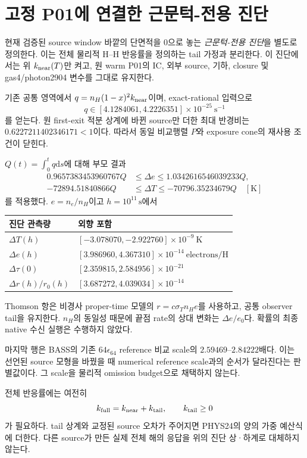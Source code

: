 \documentclass[11pt,a4paper]{article}
\newcommand{\dd}{\mathrm d}\newcommand{\kb}{k_{\rm B}}\newcommand{\ev}{\epsilon_{\rm eV}}\newcommand{\eV}{\mathrm{eV}}\newcommand{\cm}{\mathrm{CM}}\newcommand{\lab}{\mathrm{lab}}
\numberwithin{equation}{section}
\begin{document}
\newpage
\section{고정 P01에 연결한 근문턱-전용 진단}
현재 검증된 source window 바깥의 단면적을 0으로 놓는 \emph{근문턱-전용 진단}을 별도로 정의한다. 이는 전체 물리적 H--H 반응률을 정의하는 tail 가정과 분리한다. 이 진단에서는 위 $k_{\rm near}(T)$만 켜고, 원 warm P01의 IC, 외부 source, 기하, closure 및 gas4/photon2904 변수를 그대로 유지한다.

기존 공통 영역에서 $q=n_H(1-x)^2k_{\rm near}$이며, exact-rational 입력으로
\[
q\in[4.1284061,4.2226351]\times10^{-25}\ \mathrm{s^{-1}}
\]
를 얻는다. 원 first-exit 적분 상계에 바뀐 source만 더한 최대 반경비는 $0.6227211402346171<1$이다. 따라서 동일 비교행렬 $P$와 exposure cone의 재사용 조건이 닫힌다.

$Q(t)=\int_0^tq\dd s$에 대해 부모 결과
\begin{align}
0.9657383453960767Q&\le\Delta e\le1.0342616546039233Q,\\
-72894.51840866Q&\le\Delta T\le-70796.35234679Q\quad[\mathrm K]
\end{align}
를 적용했다. $e=n_e/n_H$이고 $h=10^{11}\,\mathrm s$에서
\begin{center}\begin{tabularx}{\linewidth}{@{}p{39mm}X@{}}\toprule
진단 관측량 & 외향 포함\\\midrule
$\Delta T(h)$ & $[-3.078070,-2.922760]\times10^{-9}\ \mathrm K$\\
$\Delta e(h)$ & $[3.986960,4.367310]\times10^{-14}\ \mathrm{electrons/H}$\\
$\Delta\tau(0)$ & $[2.359815,2.584956]\times10^{-21}$\\
$\Delta r(h)/r_0(h)$ & $[3.687272,4.039034]\times10^{-14}$\\\bottomrule
\end{tabularx}\end{center}
Thomson 항은 비경사 proper-time 모델의 $r=c\sigma_Tn_He$를 사용하고, 공통 observer tail을 유지한다. $n_H$의 동일성 때문에 끝점 rate의 상대 변화는 $\Delta e/e_0$다. 확률의 최종 native 수신 실행은 수행하지 않았다.

마지막 행은 BASS의 기존 $64\epsilon_{64}$ reference 비교 scale의 $2.59469$--$2.84222$배다. 이는 선언된 source 모형을 바꿨을 때 numerical reference scale과의 순서가 달라진다는 판별값이다. 그 scale을 물리적 omission budget으로 채택하지 않는다.

전체 반응률에는 여전히
\begin{equation}
k_{\rm full}=k_{\rm near}+k_{\rm tail},\qquad k_{\rm tail}\ge0
\end{equation}
가 필요하다. tail 상계와 교정된 source 오차가 주어지면 PHYS24의 양의 가중 예산식에 더한다. 다른 source가 만든 실제 전체 해의 응답을 위의 진단 상·하계로 대체하지 않는다.
\end{document}

